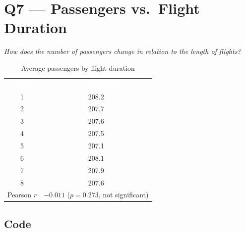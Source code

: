 \documentclass[12pt, a4paper]{report}
\newcommand{\thead}[1]{\cellcolor{themeHeaderBg}\textcolor{white}{\textbf{#1}}}
\newcommand{\talt}{\rowcolor{themeRowAlt}}
\newcommand{\trow}{\rowcolor{white}}
\begin{document}
\chapter{Q7 — Passengers vs.\ Flight Duration}

\textit{How does the number of passengers change in relation to the length of flights?}

\begin{table}[H]
\centering
\renewcommand{\arraystretch}{1.3}
\begin{tabular}{cc}
\thead{Hours} & \thead{Avg.\ Passengers} \\
\talt 1 & 208.2 \\
\trow 2 & 207.7 \\
\talt 3 & 207.6 \\
\trow 4 & 207.5 \\
\talt 5 & 207.1 \\
\trow 6 & 208.1 \\
\talt 7 & 207.9 \\
\trow 8 & 207.6 \\
\talt Pearson $r$ & $-0.011$ ($p = 0.273$, not significant) \\
\end{tabular}
\caption{Average passengers by flight duration}
\end{table}

\section{Code}
\end{document}
